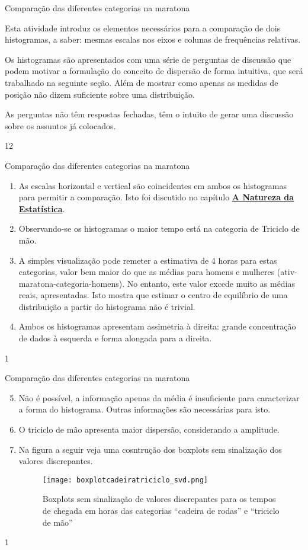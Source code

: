 \begin{sugestions}{Comparação das diferentes categorias na maratona}
{
Esta atividade introduz os elementos necessários para a comparação de dois histogramas, a saber: mesmas escalas nos eixos e colunas de frequências relativas.

Os histogramas são apresentados com uma série de perguntas de discussão que podem motivar a formulação do conceito de dispersão de forma intuitiva, que será trabalhado na seguinte seção. Além de mostrar como apenas as medidas de posição não dizem suficiente sobre uma distribuição.

As perguntas não têm respostas fechadas, têm o intuito de gerar uma discussão sobre os assuntos já colocados.
}{1}{2}
\end{sugestions}
\begin{answer}{Comparação das diferentes categorias na maratona}
{
\begin{enumerate}
\item As escalas horizontal e vertical são coincidentes em ambos os histogramas para permitir a comparação. Isto foi discutido no capítulo \hyperref[est1-chap]{\textbf{A Natureza da Estatística}}.
\item Observando-se os histogramas o maior tempo está na categoria de Triciclo de mão.
\item A simples visualização pode remeter a estimativa de 4 horas para estas categorias, valor bem maior do que as médias para homens e mulheres (ativ-maratona-categoria-homens). No entanto, este valor excede muito as médias reais, apresentadas. Isto mostra que estimar o centro de equilíbrio de uma distribuição a partir do histograma não é trivial.
\item Ambos os histogramas apresentam assimetria à direita: grande concentração de dados à esquerda e forma alongada para a direita.
\end{enumerate}
}{1}
\end{answer}
\clearmargin
\begin{answer}{Comparação das diferentes categorias na maratona}
{
\begin{enumerate}\setcounter{enumi}{4}
\item Não é possível, a informação apenas da média é insuficiente para caracterizar a forma do histograma. Outras informações são necessárias para isto.
\item O triciclo de mão apresenta maior dispersão, considerando a amplitude.
\item Na figura a seguir veja uma cosntrução dos boxplots sem sinalização dos valores discrepantes.
\begin{figure}[H]
\centering

\texttt{[image: boxplotcadeiratriciclo\_svd.png]}
\caption{Boxplots sem sinalização de valores discrepantes para os tempos de chegada em horas das categorias “cadeira de rodas”{} e “triciclo de mão”}
\label{}
\end{figure}
\end{enumerate}
}{1}
\end{answer}

